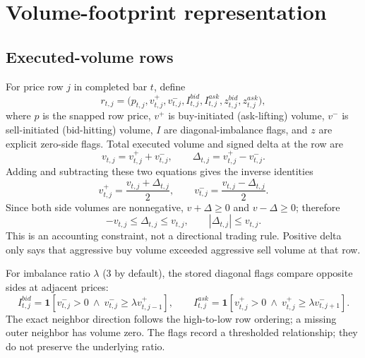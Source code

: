 \documentclass[10pt]{article}
\newcommand{\ind}{\mathbf{1}}
\begin{document}
\section{Volume-footprint representation}

\subsection{Executed-volume rows}

For price row $j$ in completed bar $t$, define
\begin{equation}
r_{t,j}=\bigl(p_{t,j},v^+_{t,j},v^-_{t,j},I^{bid}_{t,j},I^{ask}_{t,j},
z^{bid}_{t,j},z^{ask}_{t,j}\bigr),
\end{equation}
where $p$ is the snapped row price, $v^+$ is buy-initiated (ask-lifting) volume, $v^-$ is
sell-initiated (bid-hitting) volume, $I$ are diagonal-imbalance flags, and $z$ are explicit zero-side
flags. Total executed volume and signed delta at the row are
\begin{equation}
v_{t,j}=v^+_{t,j}+v^-_{t,j},\qquad
\Delta_{t,j}=v^+_{t,j}-v^-_{t,j}.
\label{eq:row-total-delta}
\end{equation}
Adding and subtracting these two equations gives the inverse identities
\begin{equation}
v^+_{t,j}=\frac{v_{t,j}+\Delta_{t,j}}{2},\qquad
v^-_{t,j}=\frac{v_{t,j}-\Delta_{t,j}}{2}.
\label{eq:row-inverse}
\end{equation}
Since both side volumes are nonnegative, $v+\Delta\ge0$ and $v-\Delta\ge0$; therefore
\begin{equation}
-v_{t,j}\le\Delta_{t,j}\le v_{t,j},\qquad |\Delta_{t,j}|\le v_{t,j}.
\end{equation}
This is an accounting constraint, not a directional trading rule. Positive delta only says that
aggressive buy volume exceeded aggressive sell volume at that row.

For imbalance ratio $\lambda$ (3 by default), the stored diagonal flags compare opposite sides at
adjacent prices:
\begin{equation}
I^{bid}_{t,j}=\ind\!\left[v^-_{t,j}>0\ \land\ v^-_{t,j}\ge\lambda v^+_{t,j-1}\right],\qquad
I^{ask}_{t,j}=\ind\!\left[v^+_{t,j}>0\ \land\ v^+_{t,j}\ge\lambda v^-_{t,j+1}\right].
\end{equation}
The exact neighbor direction follows the high-to-low row ordering; a missing outer neighbor has
volume zero. The flags record a thresholded relationship; they do not preserve the underlying ratio.
\end{document}
